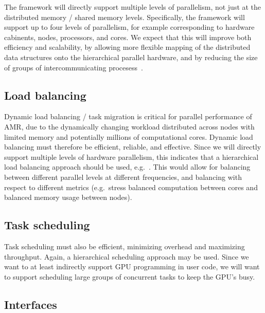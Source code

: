 \documentclass[10pt]{article}
\begin{document}
The framework will directly support multiple levels of parallelism,
not just at the distributed memory / shared memory levels.
Specifically, the framework will support up to four levels of
parallelism, for example corresponding to hardware cabinents, nodes,
processors, and cores.  We expect that this will improve both
efficiency and scalability, by allowing more flexible mapping of the
distributed data structures onto the hierarchical parallel hardware,
and by reducing the size of groups of intercommunicating
procesess~\cite{BaBu09}.

\subsection{Load balancing} \label{ss:require-balance}

Dynamic load balancing / task migration is critical for parallel
performance of AMR, due to the dynamically changing workload
distributed across nodes with limited memory and potentially millions
of computational cores.  Dynamic load balancing must therefore be
efficient, reliable, and effective.  Since we will directly support
multiple levels of hardware parallelism, this indicates that a
hierarchical load balancing approach should be used,
e.g.~\cite{LaTa06}.  This would allow for balancing between different
parallel levels at different frequencies, and balancing with respect
to different metrics (e.g.~stress balanced computation between cores
and balanced memory usage between nodes).

\subsection{Task scheduling}\label{ss:require-schedule}

Task scheduling must also be efficient, minimizing overhead and
maximizing throughput.  Again, a hierarchical scheduling approach may
be used.  Since we want to at least indirectly support GPU programming
in user code, we will want to support scheduling large groups of
concurrent tasks to keep the GPU's busy.

  
\subsection{Interfaces} \label{ss:require-interfaces}
\end{document}
